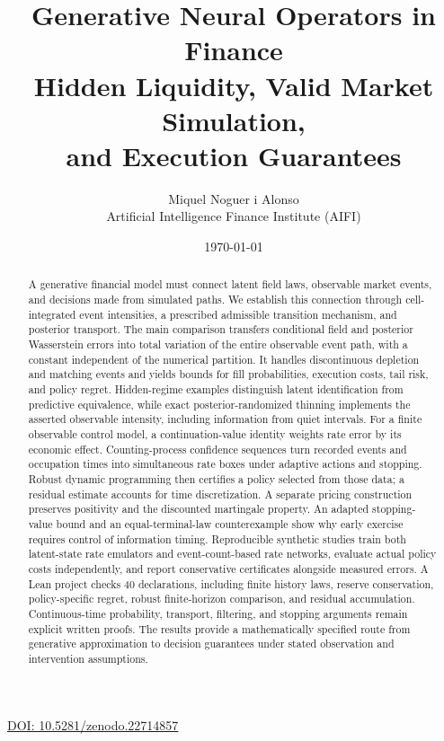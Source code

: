 \documentclass[11pt]{article}
\title{\textbf{Generative Neural Operators in Finance}\\[0.35em]
\large Hidden Liquidity, Valid Market Simulation,\\ and Execution Guarantees}
\author{Miquel Noguer i Alonso\\
\small Artificial Intelligence Finance Institute (AIFI)}
\date{\today}
\numberwithin{equation}{section}
\theoremstyle{definition}
\theoremstyle{remark}
\begin{document}
\maketitle
\thispagestyle{empty}
\begin{center}\small\href{https://doi.org/10.5281/zenodo.22714857}{DOI: 10.5281/zenodo.22714857}\end{center}
\begin{abstract}
A generative financial model must connect latent field laws, observable market events, and decisions made from simulated paths. We establish this connection through cell-integrated event intensities, a prescribed admissible transition mechanism, and posterior transport. The main comparison transfers conditional field and posterior Wasserstein errors into total variation of the entire observable event path, with a constant independent of the numerical partition. It handles discontinuous depletion and matching events and yields bounds for fill probabilities, execution costs, tail risk, and policy regret. Hidden-regime examples distinguish latent identification from predictive equivalence, while exact posterior-randomized thinning implements the asserted observable intensity, including information from quiet intervals. For a finite observable control model, a continuation-value identity weights rate error by its economic effect. Counting-process confidence sequences turn recorded events and occupation times into simultaneous rate boxes under adaptive actions and stopping. Robust dynamic programming then certifies a policy selected from those data; a residual estimate accounts for time discretization. A separate pricing construction preserves positivity and the discounted martingale property. An adapted stopping-value bound and an equal-terminal-law counterexample show why early exercise requires control of information timing. Reproducible synthetic studies train both latent-state rate emulators and event-count-based rate networks, evaluate actual policy costs independently, and report conservative certificates alongside measured errors. A Lean project checks 40 declarations, including finite history laws, reserve conservation, policy-specific regret, robust finite-horizon comparison, and residual accumulation. Continuous-time probability, transport, filtering, and stopping arguments remain explicit written proofs. The results provide a mathematically specified route from generative approximation to decision guarantees under stated observation and intervention assumptions.
\end{abstract}
\end{document}
